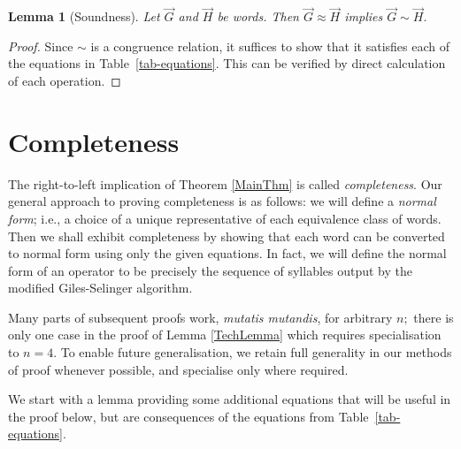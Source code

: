 \documentclass{dalthesis}
\theoremstyle{theorem}
\newtheorem{lemma}[theorem]{Lemma}
\theoremstyle{definition}
\theoremstyle{definition}  %
\theoremstyle{definition}
\renewcommand{\:}{\mathbin{:}}
\renewcommand{\vec}{\overrightarrow}
\begin{document}
\begin{lemma}[Soundness]
\label{Equiv1Equiv2Lemma1}
Let $\vec{G}$ and $\vec{H}$ be words. Then $\vec{G}\approx\vec{H}$ implies $\vec{G}\sim\vec{H}.$
\end{lemma}
\begin{proof}
Since $\sim$ is a congruence relation, it suffices to show that it satisfies each of the equations in Table~\ref{tab-equations}. This can be verified by direct calculation of each operation.
\end{proof}

\section{Completeness}

The right-to-left implication of Theorem \ref{MainThm} is called \textit{completeness}. Our general approach to proving completeness is as follows: we will define a \textit{normal form}; i.e., a choice of a unique representative of each equivalence class of words. Then we shall exhibit completeness by showing that each word can be converted to normal form using only the given equations. In fact, we will define the normal form of an operator to be precisely the sequence of syllables output by the modified Giles-Selinger algorithm.

Many parts of subsequent proofs work, \textit{mutatis mutandis}, for arbitrary $n;$ there is only one case in the proof of Lemma \ref{TechLemma} which requires specialisation to $n = 4.$ To enable future generalisation, we retain full generality in our methods of proof whenever possible, and specialise only where required. 

We start with a lemma providing some additional equations that will be
useful in the proof below, but are consequences of the equations from
Table~\ref{tab-equations}.
\end{document}
